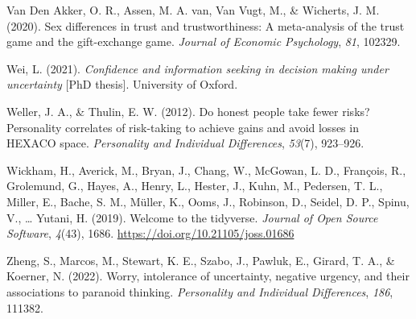 \documentclass[
  man,floatsintext]{apa6}
\newlength{\cslhangindent}
\newlength{\cslentryspacingunit} %
\newenvironment{CSLReferences}[2] %
 {%
  \setlength{\parindent}{0pt}
  \ifodd #1
  \let\oldpar\par
  \def\par{\hangindent=\cslhangindent\oldpar}
  \fi
  \setlength{\parskip}{#2\cslentryspacingunit}
 }%
 {}
\begin{document}
\begin{CSLReferences}{1}{0}
\leavevmode{}%
Van Den Akker, O. R., Assen, M. A. van, Van Vugt, M., \& Wicherts, J. M. (2020). Sex differences in trust and trustworthiness: A meta-analysis of the trust game and the gift-exchange game. \emph{Journal of Economic Psychology}, \emph{81}, 102329.

\leavevmode{}%
Wei, L. (2021). \emph{Confidence and information seeking in decision making under uncertainty} {[}PhD thesis{]}. University of Oxford.

\leavevmode{}%
Weller, J. A., \& Thulin, E. W. (2012). Do honest people take fewer risks? Personality correlates of risk-taking to achieve gains and avoid losses in HEXACO space. \emph{Personality and Individual Differences}, \emph{53}(7), 923--926.

\leavevmode{}%
Wickham, H., Averick, M., Bryan, J., Chang, W., McGowan, L. D., François, R., Grolemund, G., Hayes, A., Henry, L., Hester, J., Kuhn, M., Pedersen, T. L., Miller, E., Bache, S. M., Müller, K., Ooms, J., Robinson, D., Seidel, D. P., Spinu, V., \ldots{} Yutani, H. (2019). Welcome to the {tidyverse}. \emph{Journal of Open Source Software}, \emph{4}(43), 1686. \url{https://doi.org/10.21105/joss.01686}

\leavevmode{}%
Zheng, S., Marcos, M., Stewart, K. E., Szabo, J., Pawluk, E., Girard, T. A., \& Koerner, N. (2022). Worry, intolerance of uncertainty, negative urgency, and their associations to paranoid thinking. \emph{Personality and Individual Differences}, \emph{186}, 111382.

\end{CSLReferences}


\clearpage
\renewcommand{\listfigurename}{Figure captions}
\end{document}
